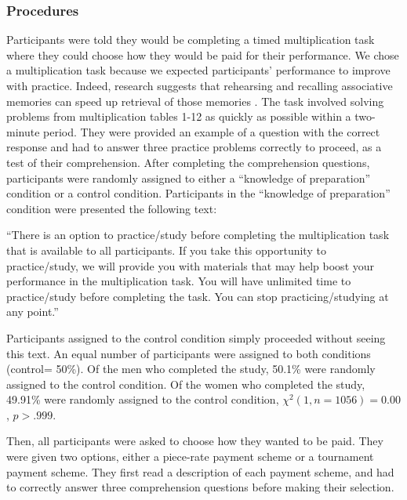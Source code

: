 \documentclass[a4paper, nobind]{templates/ociamthesis}
\begin{document}
\hypertarget{procedures}{%
\subsubsection{Procedures}\label{procedures}}

Participants were told they would be completing a timed multiplication task where they could choose how they would be paid for their performance. We chose a multiplication task because we expected participants' performance to improve with practice. Indeed, research suggests that rehearsing and recalling associative memories can speed up retrieval of those memories \autocite{Rundus1971}. The task involved solving problems from multiplication tables 1-12 as quickly as possible within a two-minute period. They were provided an example of a question with the correct response and had to answer three practice problems correctly to proceed, as a test of their comprehension. After completing the comprehension questions, participants were randomly assigned to either a ``knowledge of preparation'' condition or a control condition. Participants in the ``knowledge of preparation'' condition were presented the following text:

``There is an option to practice/study before completing the multiplication task that is available to all participants. If you take this opportunity to practice/study, we will provide you with materials that may help boost your performance in the multiplication task. You will have unlimited time to practice/study before completing the task. You can stop practicing/studying at any point.''

Participants assigned to the control condition simply proceeded without seeing this text. An equal number of participants were assigned to both conditions (control= 50\%). Of the men who completed the study, 50.1\% were randomly assigned to the control condition. Of the women who completed the study, 49.91\% were randomly assigned to the control condition, \(\chi^2(1, n = 1056) = 0.00\), \(p > .999\).

Then, all participants were asked to choose how they wanted to be paid. They were given two options, either a piece-rate payment scheme or a tournament payment scheme. They first read a description of each payment scheme, and had to correctly answer three comprehension questions before making their selection.
\end{document}
